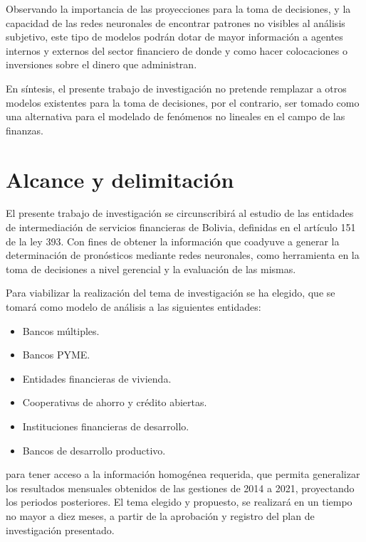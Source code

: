 \documentclass[
  12pt,
]{article}
\providecommand{\tightlist}{%
  \setlength{\itemsep}{0pt}\setlength{\parskip}{0pt}}
\begin{document}
Observando la importancia de las proyecciones para la toma de
decisiones, y la capacidad de las redes neuronales de encontrar patrones
no visibles al análisis subjetivo, este tipo de modelos podrán dotar de
mayor información a agentes internos y externos del sector financiero de
donde y como hacer colocaciones o inversiones sobre el dinero que
administran.

En síntesis, el presente trabajo de investigación no pretende remplazar
a otros modelos existentes para la toma de decisiones, por el contrario,
ser tomado como una alternativa para el modelado de fenómenos no
lineales en el campo de las finanzas.

\hypertarget{alcance-y-delimitaciuxf3n}{%
\section{Alcance y delimitación}\label{alcance-y-delimitaciuxf3n}}

El presente trabajo de investigación se circunscribirá al estudio de las
entidades de intermediación de servicios financieras de Bolivia,
definidas en el artículo 151 de la ley 393. Con fines de obtener la
información que coadyuve a generar la determinación de pronósticos
mediante redes neuronales, como herramienta en la toma de decisiones a
nivel gerencial y la evaluación de las mismas.

Para viabilizar la realización del tema de investigación se ha elegido,
que se tomará como modelo de análisis a las siguientes entidades:

\begin{itemize}
\tightlist
\item
  Bancos múltiples.
\item
  Bancos PYME.
\item
  Entidades financieras de vivienda.
\item
  Cooperativas de ahorro y crédito abiertas.
\item
  Instituciones financieras de desarrollo.
\item
  Bancos de desarrollo productivo.
\end{itemize}

para tener acceso a la información homogénea requerida, que permita
generalizar los resultados mensuales obtenidos de las gestiones de 2014
a 2021, proyectando los periodos posteriores. El tema elegido y
propuesto, se realizará en un tiempo no mayor a diez meses, a partir de
la aprobación y registro del plan de investigación presentado.
\end{document}
